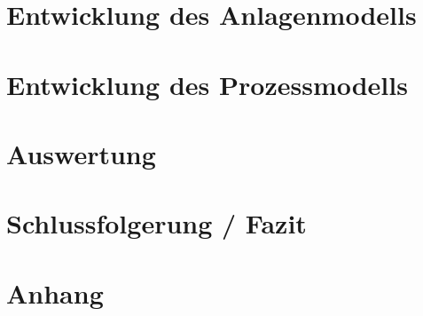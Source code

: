 \documentclass[
  a4paper,
  BCOR=15mm,            %
  twoside,
  bibliography=totoc,   %
  listof=totoc,         %
  monolingual,
  invert-title,
]{bfhthesis}
\begin{document}
\chapter{Entwicklung des Anlagenmodells} \label{Entwicklung des Anlagenmodells}




\chapter{Entwicklung des Prozessmodells} \label{Entwicklung des Prozessmodells}




\chapter{Auswertung} \label{Auswertung}




\chapter{Schlussfolgerung / Fazit} \label{Fazit}


\chapter{Anhang} \label{Anhang}


%

\declarationOfAuthorship

\clearpage


\listoffigures
 
\listoftables
 
 
\printglossary

\clearpage
\printindex
\end{document}
